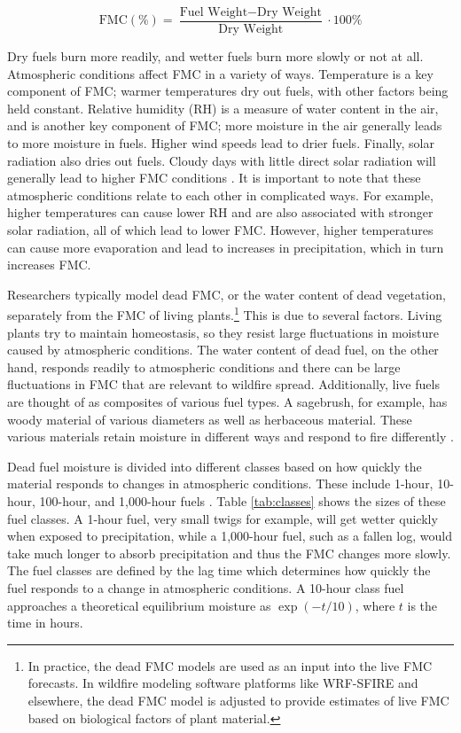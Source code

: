 \documentclass[11pt]{article}%
\begin{document}
\begin{equation}
    \text{FMC} (\%) = \frac{\text{Fuel Weight} - \text{Dry Weight}}{\text{Dry Weight}} \cdot 100\%
\end{equation}

Dry fuels burn more readily, and wetter fuels burn more slowly or not at all. Atmospheric conditions affect FMC in a variety of ways. Temperature is a key component of FMC; warmer temperatures dry out fuels, with other factors being held constant. Relative humidity (RH) is a measure of water content in the air, and is another key component of FMC; more moisture in the air generally leads to more moisture in fuels. Higher wind speeds lead to drier fuels. Finally, solar radiation also dries out fuels. Cloudy days with little direct solar radiation will generally lead to higher FMC conditions \citep{NWCG-2024-FWP}. It is important to note that these atmospheric conditions relate to each other in complicated ways. For example, higher temperatures can cause lower RH and are also associated with stronger solar radiation, all of which lead to lower FMC. However, higher temperatures can cause more evaporation and lead to increases in precipitation, which in turn increases FMC.

Researchers typically model dead FMC, or the water content of dead vegetation, separately from the FMC of living plants.\footnote{In practice, the dead FMC models are used as an input into the live FMC forecasts. In wildfire modeling software platforms like WRF-SFIRE and elsewhere, the dead FMC model is adjusted to provide estimates of live FMC based on biological factors of plant material.} This is due to several factors. Living plants try to maintain homeostasis, so they resist large fluctuations in moisture caused by atmospheric conditions. The water content of dead fuel, on the other hand, responds readily to atmospheric conditions and there can be large fluctuations in FMC that are relevant to wildfire spread. Additionally, live fuels are thought of as composites of various fuel types. A sagebrush, for example, has woody material of various diameters as well as herbaceous material. These various materials retain moisture in different ways and respond to fire differently \citep{NWCG-2024-FWP}. 

Dead fuel moisture is divided into different classes based on how quickly the material responds to changes in atmospheric conditions. These include 1-hour, 10-hour, 100-hour, and 1,000-hour fuels \citep{NCEI-2024-DFM}. Table \ref{tab:classes} shows the sizes of these fuel classes. A 1-hour fuel, very small twigs for example, will get wetter quickly when exposed to precipitation, while a 1,000-hour fuel, such as a fallen log, would take much longer to absorb precipitation and thus the FMC changes more slowly. The fuel classes are defined by the lag time which determines how quickly the fuel responds to a change in atmospheric conditions. A 10-hour class fuel approaches a theoretical equilibrium moisture as $\exp(-t/10)$, where $t$ is the time in hours.
\end{document}
